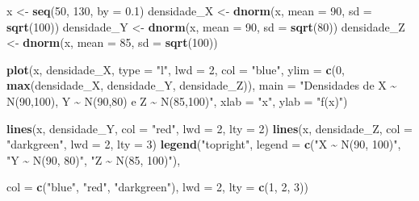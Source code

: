 \documentclass[
]{article}
\newenvironment{Shaded}{\begin{snugshade}}{\end{snugshade}}
\newcommand{\AttributeTok}[1]{\textcolor[rgb]{0.13,0.29,0.53}{#1}}
\newcommand{\DecValTok}[1]{\textcolor[rgb]{0.00,0.00,0.81}{#1}}
\newcommand{\FloatTok}[1]{\textcolor[rgb]{0.00,0.00,0.81}{#1}}
\newcommand{\FunctionTok}[1]{\textcolor[rgb]{0.13,0.29,0.53}{\textbf{#1}}}
\newcommand{\NormalTok}[1]{#1}
\newcommand{\OtherTok}[1]{\textcolor[rgb]{0.56,0.35,0.01}{#1}}
\newcommand{\StringTok}[1]{\textcolor[rgb]{0.31,0.60,0.02}{#1}}
\begin{document}
\begin{Shaded}
\begin{Highlighting}[]
\NormalTok{x }\OtherTok{\textless{}{-}} \FunctionTok{seq}\NormalTok{(}\DecValTok{50}\NormalTok{, }\DecValTok{130}\NormalTok{, }\AttributeTok{by =} \FloatTok{0.1}\NormalTok{)}
\NormalTok{densidade\_X }\OtherTok{\textless{}{-}} \FunctionTok{dnorm}\NormalTok{(x, }\AttributeTok{mean =} \DecValTok{90}\NormalTok{, }\AttributeTok{sd =} \FunctionTok{sqrt}\NormalTok{(}\DecValTok{100}\NormalTok{))}
\NormalTok{densidade\_Y }\OtherTok{\textless{}{-}} \FunctionTok{dnorm}\NormalTok{(x, }\AttributeTok{mean =} \DecValTok{90}\NormalTok{, }\AttributeTok{sd =} \FunctionTok{sqrt}\NormalTok{(}\DecValTok{80}\NormalTok{))}
\NormalTok{densidade\_Z }\OtherTok{\textless{}{-}} \FunctionTok{dnorm}\NormalTok{(x, }\AttributeTok{mean =} \DecValTok{85}\NormalTok{, }\AttributeTok{sd =} \FunctionTok{sqrt}\NormalTok{(}\DecValTok{100}\NormalTok{))}

\FunctionTok{plot}\NormalTok{(x, densidade\_X, }\AttributeTok{type =} \StringTok{"l"}\NormalTok{, }\AttributeTok{lwd =} \DecValTok{2}\NormalTok{, }\AttributeTok{col =} \StringTok{"blue"}\NormalTok{,}
     \AttributeTok{ylim =} \FunctionTok{c}\NormalTok{(}\DecValTok{0}\NormalTok{, }\FunctionTok{max}\NormalTok{(densidade\_X, densidade\_Y, densidade\_Z)),}
     \AttributeTok{main =} \StringTok{"Densidades de X \textasciitilde{} N(90,100), Y \textasciitilde{} N(90,80) e Z \textasciitilde{} N(85,100)"}\NormalTok{,}
     \AttributeTok{xlab =} \StringTok{"x"}\NormalTok{, }\AttributeTok{ylab =} \StringTok{"f(x)"}\NormalTok{)}

\FunctionTok{lines}\NormalTok{(x, densidade\_Y, }\AttributeTok{col =} \StringTok{"red"}\NormalTok{, }\AttributeTok{lwd =} \DecValTok{2}\NormalTok{, }\AttributeTok{lty =} \DecValTok{2}\NormalTok{)}
\FunctionTok{lines}\NormalTok{(x, densidade\_Z, }\AttributeTok{col =} \StringTok{"darkgreen"}\NormalTok{, }\AttributeTok{lwd =} \DecValTok{2}\NormalTok{, }\AttributeTok{lty =} \DecValTok{3}\NormalTok{)}
\FunctionTok{legend}\NormalTok{(}\StringTok{"topright"}\NormalTok{, }\AttributeTok{legend =} \FunctionTok{c}\NormalTok{(}\StringTok{"X \textasciitilde{} N(90, 100)"}\NormalTok{, }\StringTok{"Y \textasciitilde{} N(90, 80)"}\NormalTok{, }\StringTok{"Z \textasciitilde{} N(85, 100)"}\NormalTok{),}

       \AttributeTok{col =} \FunctionTok{c}\NormalTok{(}\StringTok{"blue"}\NormalTok{, }\StringTok{"red"}\NormalTok{, }\StringTok{"darkgreen"}\NormalTok{), }\AttributeTok{lwd =} \DecValTok{2}\NormalTok{, }\AttributeTok{lty =} \FunctionTok{c}\NormalTok{(}\DecValTok{1}\NormalTok{, }\DecValTok{2}\NormalTok{, }\DecValTok{3}\NormalTok{))}
\end{Highlighting}
\end{Shaded}
\end{document}
